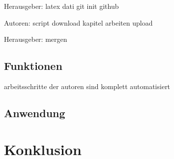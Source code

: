 \documentclass[12pt,a4paper]{scrartcl}
\begin{document}
Herausgeber:
latex dati
git init
github

Autoren:
script
download
kapitel
arbeiten upload

Herausgeber:
mergen

\subsection{Funktionen}

arbeitsschritte der autoren sind komplett automatisiert

\subsection{Anwendung}

\section{Konklusion}
\end{document}
